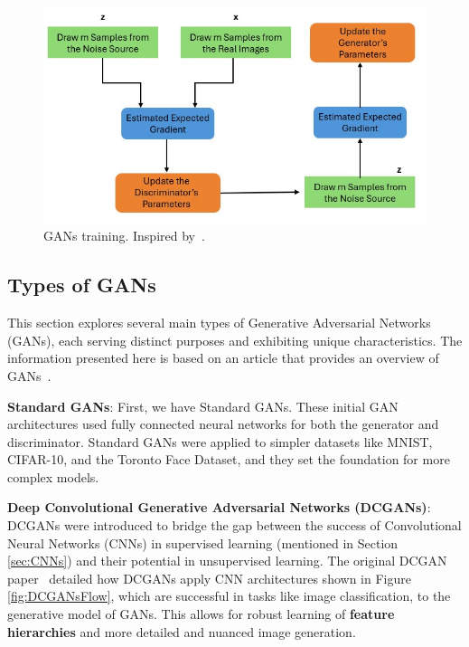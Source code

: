 \begin{figure}[!htb]
    \centering
    \includegraphics[scale=0.65]{Images/gan-training.jpg}
    \caption{GANs training. Inspired by~\cite{GANOverview}.}
    \label{fig:GANTraining}
\end{figure}

\subsection{Types of GANs}
\label{ssec:typesOfGANs}

This section explores several main types of Generative Adversarial Networks (GANs), each serving distinct purposes and exhibiting unique characteristics. The information presented here is based on an article that provides an overview of GANs~\cite{GANOverview}.

\textbf{Standard GANs}: First, we have Standard GANs. These initial GAN architectures used fully connected neural networks for both the generator and discriminator. Standard GANs were applied to simpler datasets like MNIST, CIFAR-10, and the Toronto Face Dataset, and they set the foundation for more complex models.

\textbf{Deep Convolutional Generative Adversarial Networks (DCGANs)}: DCGANs were introduced to bridge the gap between the success of Convolutional Neural Networks (CNNs) in supervised learning (mentioned in Section \ref{sec:CNNs}) and their potential in unsupervised learning. The original DCGAN paper~\cite{OriginalDCGAN} detailed how DCGANs apply CNN architectures shown in Figure \ref{fig:DCGANsFlow}, which are successful in tasks like image classification, to the generative model of GANs. This allows for robust learning of \textbf{feature hierarchies} and more detailed and nuanced image generation.



